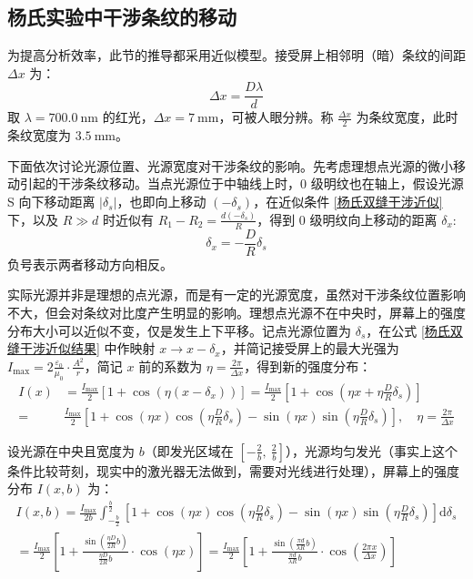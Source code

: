 \documentclass[UTF8]{report}
\theoremstyle{MyLineTheoremStyle} %
\theoremstyle{MyBlockTheoremStyle} %
\theoremstyle{MySubsubsectionStyle} %
\begin{document}
\subsection{杨氏实验中干涉条纹的移动}

为提高分析效率，此节的推导都采用近似模型。接受屏上相邻明（暗）条纹的间距 $\Delta x$ 为：
\begin{equation}
\Delta x = \frac{D \lambda}{d}
\end{equation}
取 $\lambda = 700.0\ \mathrm{nm}$ 的红光，$\Delta x = 7 \ \mathrm{mm}$，可被人眼分辨。称 $\frac{\Delta x}{2}$ 为条纹宽度，此时条纹宽度为 $3.5\ \mathrm{mm}$。

下面依次讨论光源位置、光源宽度对干涉条纹的影响。先考虑理想点光源的微小移动引起的干涉条纹移动。当点光源位于中轴线上时，0 级明纹也在轴上，假设光源 S 向下移动距离 $| \delta_s |$，也即向上移动 $(-\delta_s)$，在近似条件 \ref{杨氏双缝干涉近似} 下，以及 $R \gg d$ 时近似有 $R_1 - R_2 = \frac{d(-\delta_s)}{R}$，得到 0 级明纹向上移动的距离 $\delta_x$: 
\begin{equation}
\delta_x = - \frac{D}{R}\delta_s
\end{equation}
负号表示两者移动方向相反。

实际光源并非是理想的点光源，而是有一定的光源宽度，虽然对干涉条纹位置影响不大，但会对条纹对比度产生明显的影响。理想点光源不在中央时，屏幕上的强度分布大小可以近似不变，仅是发生上下平移。记点光源位置为 $\delta_s$，在公式 \ref{杨氏双缝干涉近似结果} 中作映射 $x \longrightarrow x - \delta_x$，并简记接受屏上的最大光强为 $I_{\text{max}} = 2 \frac{\varepsilon_0}{\mu_0} \cdot \frac{A^2}{r}$，简记 $x$ 前的系数为 $\eta = \frac{2 \pi}{\Delta x}$，得到新的强度分布：
\begin{align}
I(x) &= \frac{I_{\text{max}}}{2}\left[
1 + \cos \left( \eta (x - \delta_x)\right)
\right] = \frac{I_{\text{max}}}{2}\left[
    1 + \cos \left( \eta x + \eta\frac{D}{R}\delta_s\right)
    \right]
\\
= &
\frac{I_{\text{max}}}{2}\left[
1 + \cos \left( \eta x \right)\cos \left(\eta\frac{D}{R}\delta_s \right) - \sin \left( \eta x \right)\sin \left( \eta\frac{D}{R}\delta_s \right)
\right],\quad \eta = \frac{2 \pi}{\Delta x}
\end{align}



设光源在中央且宽度为 $b$（即发光区域在 $[-\frac{2}{b},\ \frac{2}{b}]$），光源均匀发光（事实上这个条件比较苛刻，现实中的激光器无法做到，需要对光线进行处理），屏幕上的强度分布 $I(x, b)$ 为：
\begin{gather}
I(x, b) = \frac{I_{\text{max}}}{2b} \int_{-\frac{b}{2}}^{\frac{b}{2}} \left[ 1 + \cos \left( \eta x \right)\cos \left( \eta\frac{D}{R}\delta_s \right) - \sin \left( \eta x \right)\sin \left( \eta\frac{D}{R}\delta_s \right) \right] \mathrm{d} \delta_s \\ 
= \frac{I_{\text{max}}}{2} \left[ 1 + \frac{\sin \left( \frac{\eta D}{2 R} b \right)}{\frac{\eta D}{2 R} b}\cdot \cos \left( \eta x \right) \right] = \frac{I_{\text{max}}}{2} \left[ 1 + \frac{\sin \left( \frac{\pi d}{\lambda R} b \right)}{\frac{\pi d}{\lambda R} b}\cdot \cos \left( \frac{2 \pi x}{\Delta x}  \right) \right]
\end{gather}
\end{document}
